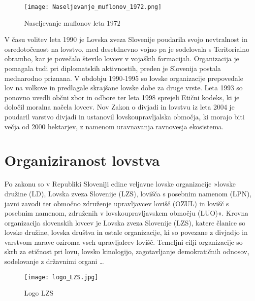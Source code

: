 \documentclass[a4paper,12pt,openright]{book}
\begin{document}
\begin{figure}[h!]
    \centering
    \texttt{[image: Naseljevanje\_muflonov\_1972.png]}
    \caption{Naseljevanje muflonov leta 1972 \cite{bolcina_osebna}}
    \label{fig:muflonov_1972}
\end{figure}

V času volitev leta 1990 je Lovska zveza Slovenije poudarila svojo nevtralnost in osredotočenost na lovstvo, med desetdnevno vojno pa je sodelovala s Teritorialno obrambo, kar je povečalo število lovcev v vojaških formacijah. 
Organizacija je pomagala tudi pri diplomatskih aktivnostih, preden je Slovenija postala mednarodno priznana. 
V obdobju 1990-1995 so lovske organizacije prepovedale lov na volkove in predlagale skrajšane lovske dobe za druge vrste.
Leta 1993 so ponovno uvedli občni zbor in odbore ter leta 1998 sprejeli Etični kodeks, ki je določil moralna načela lovcev. 
Nov Zakon o divjadi in lovstvu iz leta 2004 je poudaril varstvo divjadi in ustanovil lovskoupravljalska območja, ki morajo biti večja od 2000 hektarjev, z namenom uravnavanja ravnovesja ekosistema.\cite{Sto_83_104}

\section{Organiziranost lovstva}

Po zakonu so v Republiki Sloveniji edine veljavne lovske organizacije »lovske družine (LD), Lovska zveza Slovenije (LZS), lovišča s posebnim namenom (LPN), javni zavodi ter območno združenje upravljavcev lovišč (OZUL) in lovišč s posebnim namenom, združenih v lovskoupravljavskem območju (LUO)«\parencite[64]{Lov}. 
Krovna organizacija slovenskih lovcev je Lovska zveza Slovenije (LZS), katere članice so lovske družine, lovska društva in ostale organizacije, ki so povezane z divjadjo in varstvom narave oziroma vseh upravljalcev lovišč. 
Temeljni cilji organizacije so skrb za etičnost pri lovu, lovsko kinologijo, zagotavljanje demokratičnih odnosov, sodelovanje z državnimi organi … 

\begin{figure}[h!]
    \centering
    \texttt{[image: logo\_LZS.jpg]}
    \caption{Logo LZS \cite{bolcina_osebna}}
    \label{fig:logo}
\end{figure}
\end{document}
